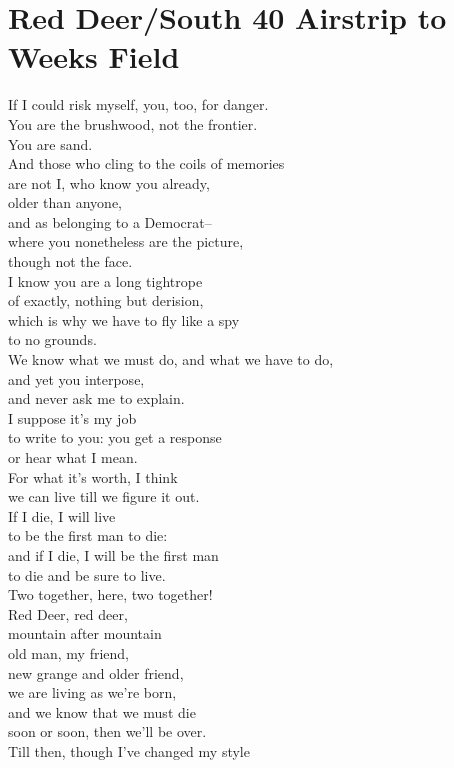 \documentclass[smalldemyvopaper,11pt,twoside,onecolumn,openright,extrafontsizes]{memoir}
\begin{document}
\chapter{Red Deer/South 40 Airstrip to Weeks Field}
If I could risk myself, you, too, for danger.
\\You are the brushwood, not the frontier.
\\You are sand.
\\And those who cling to the coils of memories
\\are not I, who know you already,
\\older than anyone,
\\and as belonging to a Democrat--
\\where you nonetheless are the picture,
\\though not the face.
\\I know you are a long tightrope
\\of exactly, nothing but derision,
\\which is why we have to fly like a spy
\\to no grounds.
\\We know what we must do, and what we have to do,
\\and yet you interpose,
\\and never ask me to explain.
\\I suppose it's my job
\\to write to you: you get a response
\\or hear what I mean.
\\For what it's worth, I think
\\we can live till we figure it out.
\\If I die, I will live
\\to be the first man to die:
\\and if I die, I will be the first man
\\to die and be sure to live.
\\Two together, here, two together!
\\Red Deer, red deer,
\\mountain after mountain
\\old man, my friend,
\\new grange and older friend,
\\we are living as we're born,
\\and we know that we must die
\\soon or soon, then we'll be over.
\\Till then, though I've changed my style
\end{document}
